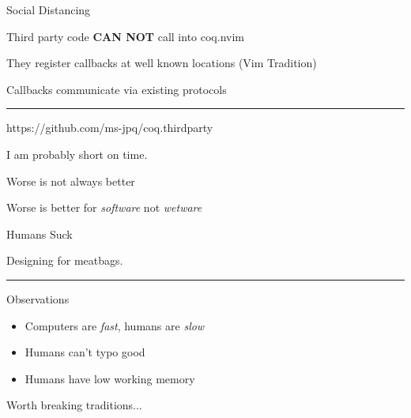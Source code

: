 \documentclass{beamer}
\begin{document}
\begin{frame}{Social Distancing}

	Third party code \textbf{CAN NOT} call into coq.nvim

	They register callbacks at well known locations (Vim Tradition)

	Callbacks communicate via existing protocols

	\rule{\textwidth}{0.1em}

	https://github.com/ms-jpq/coq.thirdparty

\end{frame}


\begin{frame}[standout]

	I am probably short on time.

\end{frame}


\begin{frame}[standout]

	Worse is not always better

	Worse is better for \textit{software} not \textit{wetware}

\end{frame}


\begin{frame}{Humans Suck}

	Designing for meatbags.

	\rule{\textwidth}{0.1em}

	\begin{block}{Observations}

		\begin{itemize}

			\item Computers are \textit{fast}, humans are \textit{slow}

			\item Humans can't typo good

			\item Humans have low working memory

		\end{itemize}

	\end{block}

	Worth breaking traditions...

\end{frame}
\end{document}
